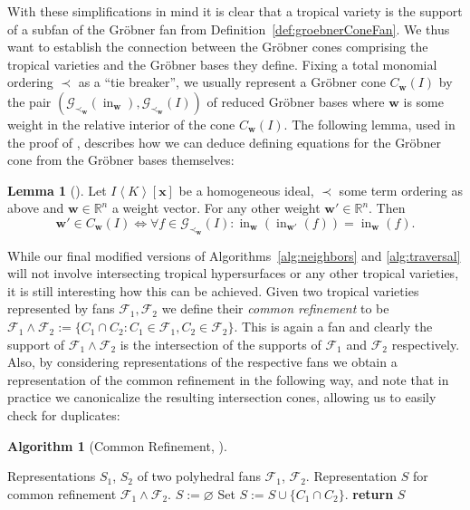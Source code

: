 \documentclass[
  paper=a4,
  titlepage,
  bibliography=totoc,
  listof=totoc,
  pagesize=pdftex
]{scrartcl}
\numberwithin{figure}{section}
\numberwithin{equation}{section}
\numberwithin{table}{section}
\newcommand*\setR{\mathds{R}}
\newcommand*\ideal[1]{\left\langle #1 \right\rangle}
\let\vec\mathbf
\DeclareMathOperator{\initial}{in}
\theoremstyle{definition}
\newtheorem{lemma}[definition]{Lemma}
\newtheorem{algo}[definition]{Algorithm}
\numberwithin{definition}{section}
\begin{document}
With these simplifications in mind it is clear that a tropical variety is the support of a
subfan of the Gröbner fan from Definition~\ref{def:groebnerConeFan}. We thus want to
establish the connection between the Gröbner cones comprising the tropical varieties and
the Gröbner bases they define. Fixing a total monomial ordering $\prec$ as a \enquote{tie
breaker}, we usually represent a Gröbner cone $C_{\vec w}(I)$ by the pair $(\mathcal
G_{\prec_{\vec w}}(\initial_{\vec w}), \mathcal G_{\prec_{\vec w}}(I))$ of reduced Gröbner
bases where $\vec w$ is some weight in the relative interior of the cone $C_{\vec w}(I)$.
The following lemma, used in the proof of \cite[Proposition~2.3]{SturmGBCP}, describes how
we can deduce defining equations for the Gröbner cone from the Gröbner bases themselves:

\begin{lemma}[{\cite[Lemma~4.2]{compTropVar}}]
  \label{lem:grConEq}
  Let $I \ideal K[\vec x]$ be a homogeneous ideal, $\prec$ some term ordering as above and
  $\vec w \in \setR^n$ a weight vector. For any other weight $\vec w' \in \setR^n$. Then
  \[
    \vec w' \in C_{\vec w}(I) \iff
    \forall f \in \mathcal G_{\prec_{\vec w}}(I) :
    \initial_{\vec w}(\initial_{\vec w'}(f)) = \initial_{\vec w}(f).
  \]
\end{lemma}


While our final modified versions of Algorithms~\ref{alg:neighbors} and \ref{alg:traversal}
will not involve intersecting tropical hypersurfaces or any other tropical varieties, it
is still interesting how this can be achieved. Given two tropical varieties
represented by fans $\mathcal F_1, \mathcal F_2$ we define their \emph{common refinement}
to be $\mathcal F_1 \wedge \mathcal F_2 := \{ C_1 \cap C_2 : C_1 \in \mathcal F_1, C_2 \in
\mathcal F_2 \}$. This is again a fan and clearly the support of $\mathcal F_1 \wedge
\mathcal F_2$ is the intersection of the supports of $\mathcal F_1$ and $\mathcal F_2$
respectively. Also, by considering representations of the respective fans we obtain a
representation of the common refinement in the following way, and note that in practice we
canonicalize the resulting intersection cones, allowing us to easily check for duplicates:

\begin{algo}[Common Refinement, {\cite[Algorithm~4.4]{compTropVar}}]\
  \label{alg:fanRefinement}
  \begin{algorithmic}[1]
    \Require Representations $S_1$, $S_2$ of two polyhedral fans $\mathcal
      F_1$, $\mathcal F_2$.
    \Ensure Representation $S$ for common refinement $\mathcal F_1 \wedge \mathcal F_2$.
    \State $S := \varnothing$
      \State Set $S := S \cup \{ C_1 \cap C_2 \}$.
    \EndFor
    \State\textbf{return} $S$
  \end{algorithmic}
\end{algo}
\end{document}
